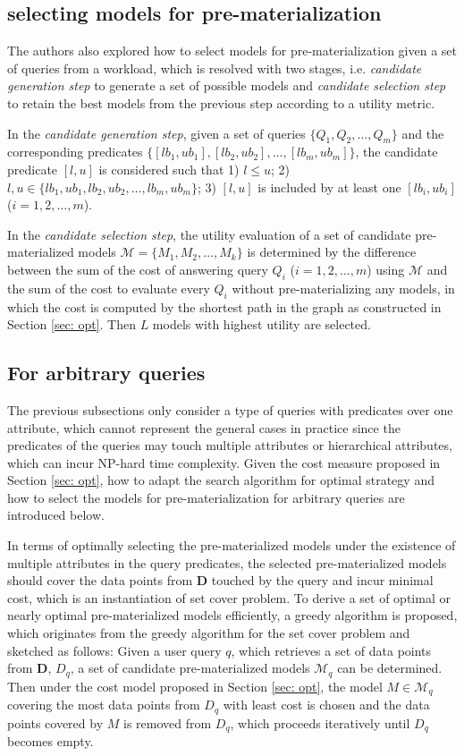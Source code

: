 \subsection{selecting models for pre-materialization}\label{sec: select_models}
The authors also explored how to select models for pre-materialization given a set of queries from a workload, which is resolved with two stages, i.e. {\em candidate generation step} to generate a set of possible models and {\em candidate selection step} to retain the best models from the previous step according to a utility metric.

In the {\em candidate generation step}, given a set of queries $\{Q_1, Q_2, \dots, Q_m\}$ and the corresponding predicates $\{[lb_1, ub_1], [lb_2, ub_2], \dots, [lb_m, ub_m]\}$, the candidate predicate $[l, u]$ is considered such that 1) $l \leq u$; 2) $l, u \in \{lb_1, ub_1, lb_2, ub_2, \dots, lb_m, ub_m\}$; 3) $[l, u]$ is included by at least one $[lb_i, ub_i]$ ($i=1,2,\dots, m$).

In the {\em candidate selection step}, the utility evaluation of a set of candidate pre-materialized models $\mathcal{M} = \{M_1, M_2, \dots, M_k\}$ is determined by the difference between the sum of the cost of answering query $Q_i$ ($i=1,2,\dots, m$) using $\mathcal{M}$ and the sum of the cost to evaluate every $Q_i$ without pre-materializing any models, in which the cost is computed by the shortest path in the graph as constructed in Section \ref{sec: opt}. Then $L$ models with highest utility are selected.

\subsection{For arbitrary queries}
The previous subsections only consider a type of queries with predicates over one attribute, which cannot represent the general cases in practice since the predicates of the queries may touch multiple attributes or hierarchical attributes, which can incur NP-hard time complexity. Given the cost measure proposed in Section \ref{sec: opt}, how to adapt the search algorithm for optimal strategy and how to select the models for pre-materialization for arbitrary queries are introduced below.

In terms of optimally selecting the pre-materialized models under the existence of multiple attributes in the query predicates, the selected pre-materialized models should cover the data points from $\textbf{D}$ touched by the query and incur minimal cost, which is an instantiation of set cover problem. To derive a set of optimal or nearly optimal pre-materialized models efficiently, a greedy algorithm is proposed, which originates from the greedy algorithm for the set cover problem and sketched as follows: Given a user query $q$, which retrieves a set of data points from $\textbf{D}$, $D_q$, a set of candidate pre-materialized models $\mathcal{M}_q$ can be determined. Then under the cost model proposed in Section \ref{sec: opt}, the model $M \in \mathcal{M}_q$ covering the most data points from $D_q$ with least cost is chosen and the data points covered by $M$ is removed from $D_q$, which proceeds iteratively until $D_q$ becomes empty.

